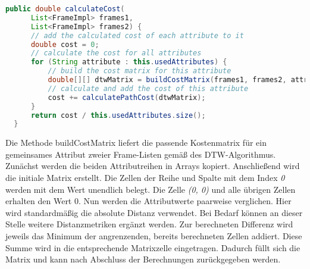 \begin{lstlisting}[language=Java, caption=DTW: Berechnung der Kosten.]
  public double calculateCost(
      List<FrameImpl> frames1,
      List<FrameImpl> frames2) {
      // add the calculated cost of each attribute to it
      double cost = 0;
      // calculate the cost for all attributes
      for (String attribute : this.usedAttributes) {
          // build the cost matrix for this attribute
          double[][] dtwMatrix = buildCostMatrix(frames1, frames2, attribute);
          // calculate and add the cost of this attribute
          cost += calculatePathCost(dtwMatrix);
      }
      return cost / this.usedAttributes.size();
  }
\end{lstlisting}
Die Methode buildCostMatrix liefert die passende Kostenmatrix für ein gemeinsames Attribut
zweier Frame-Listen gemäß des \ac{DTW}-Algorithmus.
Zunächst werden die beiden Attributreihen in Arrays kopiert.
Anschließend wird die initiale Matrix erstellt.
Die Zellen der Reihe und Spalte mit dem Index \emph{0} werden mit dem Wert {\glqq unendlich\grqq} belegt.
Die Zelle \emph{(0, 0)} und alle übrigen Zellen erhalten den Wert 0.
Nun werden die Attributwerte paarweise verglichen.
Hier wird standardmäßig die absolute Distanz verwendet.
Bei Bedarf können an dieser Stelle weitere Distanzmetriken ergänzt werden.
Zur berechneten Differenz wird jeweils das Minimum der angrenzenden, bereits berechneten Zellen addiert.
Diese Summe wird in die entsprechende Matrixzelle eingetragen.
Dadurch füllt sich die Matrix und kann nach Abschluss der Berechnungen zurückgegeben werden.
